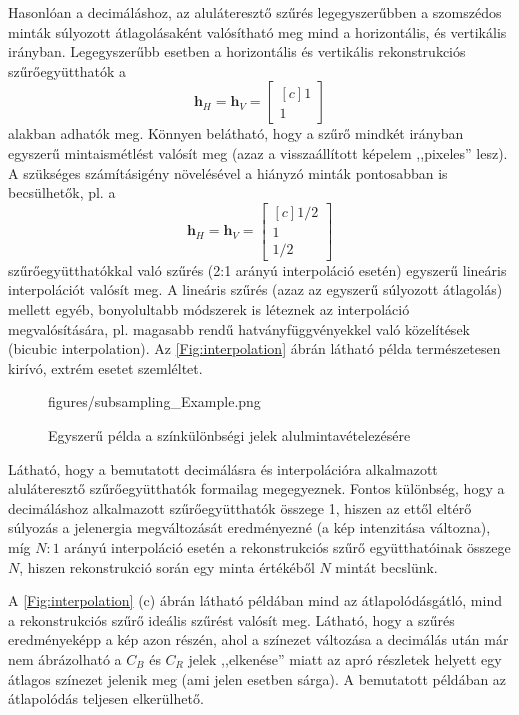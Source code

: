 Hasonlóan a decimáláshoz, az aluláteresztő szűrés legegyszerűbben a szomszédos minták súlyozott átlagolásaként valósítható meg mind a horizontális, és vertikális irányban. 
Legegyszerűbb esetben a horizontális és vertikális rekonstrukciós szűrőegyütthatók a
\begin{equation}
\mathbf{h}_H =
\mathbf{h}_V =
\begin{bmatrix}[c]
       1 \\[0.3em]
       1\end{bmatrix}
\end{equation}
alakban adhatók meg.
Könnyen belátható, hogy a szűrő mindkét irányban egyszerű mintaismétlést valósít meg (azaz a visszaállított képelem ,,pixeles'' lesz).
A szükséges számításigény növelésével a hiányzó minták pontosabban is becsülhetők, pl. a 
\begin{equation}
\mathbf{h}_H =
\mathbf{h}_V =
\begin{bmatrix}[c]
       1/2 \\[0.3em]
       1 \\[0.3em]
       1/2 \end{bmatrix}
\end{equation}
szűrőegyütthatókkal való szűrés (2:1 arányú interpoláció esetén) egyszerű lineáris interpolációt valósít meg.
A lineáris szűrés (azaz az egyszerű súlyozott átlagolás) mellett egyéb, bonyolultabb módszerek is léteznek az interpoláció megvalósítására, pl. magasabb rendű hatványfüggvényekkel való közelítések (bicubic interpolation).
Az \ref{Fig:interpolation} ábrán látható példa természetesen kirívó, extrém esetet szemléltet.
\begin{figure}[]
	\centering
	\begin{overpic}[width = 1\columnwidth]{figures/subsampling_Example.png}
 	\end{overpic}
	\caption{Egyszerű példa a színkülönbségi jelek alulmintavételezésére}
	\label{Fig:chroma_subsampling_Ex}
\end{figure}

Látható, hogy a bemutatott decimálásra és interpolációra alkalmazott aluláteresztő szűrőegyütthatók formailag megegyeznek.
Fontos különbség, hogy a decimáláshoz alkalmazott szűrőegyütthatók összege 1, hiszen az ettől eltérő súlyozás a jelenergia megváltozását eredményezné (a kép intenzitása változna), míg $N:1$ arányú interpoláció esetén a rekonstrukciós szűrő együtthatóinak összege $N$, hiszen rekonstrukció során egy minta értékéből $N$ mintát becslünk.

A \ref{Fig:interpolation} (c) ábrán látható példában mind az átlapolódásgátló, mind a rekonstrukciós szűrő ideális szűrést valósít meg.
Látható, hogy a szűrés eredményeképp a kép azon részén, ahol a színezet változása a decimálás után már nem ábrázolható a $C_B$ és $C_R$ jelek ,,elkenése'' miatt az apró részletek helyett egy átlagos színezet jelenik meg (ami jelen esetben sárga).
A bemutatott példában az átlapolódás teljesen elkerülhető.

